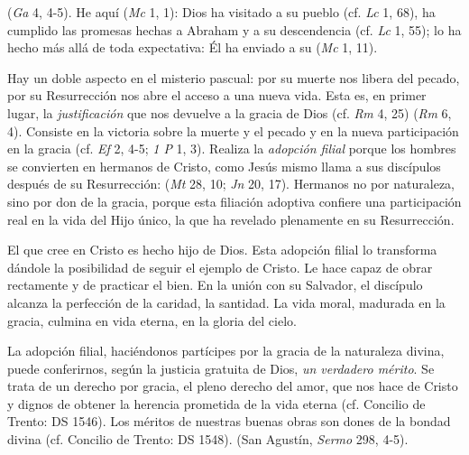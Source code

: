 	
	  (\emph{Ga} 4, 4-5). He aquí  (\emph{Mc} 1, 1): Dios ha visitado a su pueblo (cf. \emph{Lc} 1, 68), ha cumplido las promesas hechas a Abraham y a su descendencia (cf. \emph{Lc} 1, 55); lo ha hecho más allá de toda expectativa: Él ha enviado a su  (\emph{Mc} 1, 11).
	
	 Hay un doble aspecto en el misterio pascual: por su muerte nos libera del pecado, por su Resurrección nos abre el acceso a una nueva vida. Esta es, en primer lugar, la \emph{justificación} que nos devuelve a la gracia de Dios (cf. \emph{Rm} 4, 25)  (\emph{Rm} 6, 4). Consiste en la victoria sobre la muerte y el pecado y en la nueva participación en la gracia (cf. \emph{Ef} 2, 4-5; \emph{1 P} 1, 3). Realiza la \emph{adopción filial} porque los hombres se convierten en hermanos de Cristo, como Jesús mismo llama a sus discípulos después de su Resurrección:  (\emph{Mt} 28, 10; \emph{Jn} 20, 17). Hermanos no por naturaleza, sino por don de la gracia, porque esta filiación adoptiva confiere una participación real en la vida del Hijo único, la que ha revelado plenamente en su Resurrección.
	
	 El que cree en Cristo es hecho hijo de Dios. Esta adopción filial lo transforma dándole la posibilidad de seguir el ejemplo de Cristo. Le hace capaz de obrar rectamente y de practicar el bien. En la unión con su Salvador, el discípulo alcanza la perfección de la caridad, la santidad. La vida moral, madurada en la gracia, culmina en vida eterna, en la gloria del cielo.
	
	 La adopción filial, haciéndonos partícipes por la gracia de la naturaleza divina, puede conferirnos, según la justicia gratuita de Dios, \emph{un verdadero mérito}. Se trata de un derecho por gracia, el pleno derecho del amor, que nos hace  de Cristo y dignos de obtener la herencia prometida de la vida eterna (cf. Concilio de Trento: DS 1546). Los méritos de nuestras buenas obras son dones de la bondad divina (cf. Concilio de Trento: DS 1548).  (San Agustín, \emph{Sermo} 298, 4-5).
	
